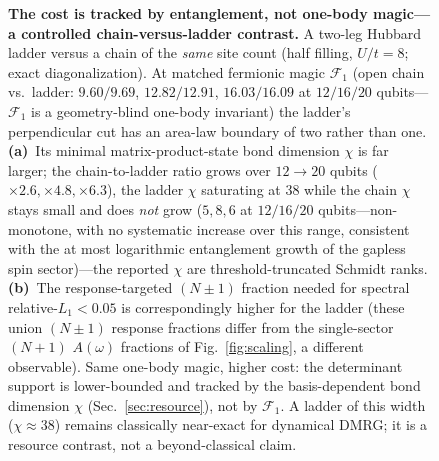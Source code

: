 \begin{figure}[htbp]\centering
\caption{\textbf{The cost is tracked by entanglement, not one-body magic---a controlled chain-versus-ladder
contrast.} A two-leg Hubbard ladder versus a chain of the \emph{same} site count (half filling,
$U/t=8$; exact diagonalization). At matched fermionic magic $\mathcal F_1$ (open chain vs.\ ladder: $9.60/9.69$,
$12.82/12.91$, $16.03/16.09$ at $12/16/20$ qubits---$\mathcal F_1$ is a geometry-blind one-body invariant)
the ladder's perpendicular cut has an area-law boundary of two rather than one. \textbf{(a)}~Its minimal
matrix-product-state bond dimension $\chi$ is far larger; the chain-to-ladder ratio grows over
$12\to20$ qubits ($\times2.6,\times4.8,\times6.3$), the ladder $\chi$ saturating at $38$ while the chain
$\chi$ stays small and does \emph{not} grow ($5,8,6$ at $12/16/20$ qubits---non-monotone, with no systematic
increase over this range, consistent with the at most logarithmic entanglement growth of the gapless spin
sector)---the reported $\chi$ are threshold-truncated Schmidt ranks. \textbf{(b)}~The response-targeted $(N{\pm}1)$ fraction needed for spectral
relative-$L_1<0.05$ is correspondingly higher for the ladder (these union $(N{\pm}1)$ response fractions
differ from the single-sector $(N{+}1)$ $A(\omega)$ fractions of Fig.~\ref{fig:scaling}, a different
observable). Same one-body magic, higher cost: the
determinant support is lower-bounded and tracked by the basis-dependent bond dimension $\chi$ (Sec.~\ref{sec:resource}), not
by $\mathcal F_1$. A ladder of this width ($\chi\!\approx\!38$) remains classically near-exact for dynamical
DMRG; it is a resource contrast, not a beyond-classical claim.}\label{fig:ladder}\end{figure}
